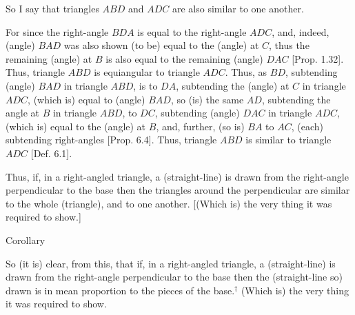 \begin{Parallel}{}{}
{ So I say that triangles $ABD$ and $ADC$ are also similar to one another.
 
 For since the right-angle $BDA$ is equal to the right-angle $ADC$, and, indeed,
 (angle) $BAD$ was also shown (to be) equal to the (angle) at $C$, thus the
 remaining (angle) at $B$ is also equal to the remaining (angle) $DAC$ 
 [Prop. 1.32].
  Thus, triangle $ABD$ is equiangular to triangle $ADC$.
 Thus, as $BD$, subtending (angle) $BAD$ in triangle $ABD$, is to
 $DA$, subtending the (angle) at $C$ in triangle $ADC$, (which is) equal to (angle) $BAD$, so (is) the
 same $AD$, subtending the angle at $B$ in triangle $ABD$, to $DC$, subtending
 (angle) $DAC$ in triangle $ADC$, (which is) equal to the (angle) at $B$,
 and, further, (so is) $BA$ to $AC$, (each) subtending  right-angles [Prop. 6.4]. Thus, triangle $ABD$ is similar to
 triangle $ADC$  [Def. 6.1].
 
 Thus,  if, in a right-angled triangle, a (straight-line) is drawn from the right-angle perpendicular
to the base then the triangles around the perpendicular are similar to
the whole (triangle), and to one another. [(Which is) the very thing it
was required to show.]\\

\begin{center}
{\large Corollary}
\end{center}\vspace*{-7pt}

So (it is) clear, from this, that if, in a right-angled triangle, a
(straight-line) is drawn from the right-angle perpendicular to the base then the (straight-line so)
drawn is in mean proportion to the pieces of the base.$^\dag$ (Which
is) the very thing it was required to show.}
\end{Parallel}


\vspace{7pt}{\footnotesize \noindent$^\dag$ In other words, the perpendicular is the geometric mean of the pieces.} 

